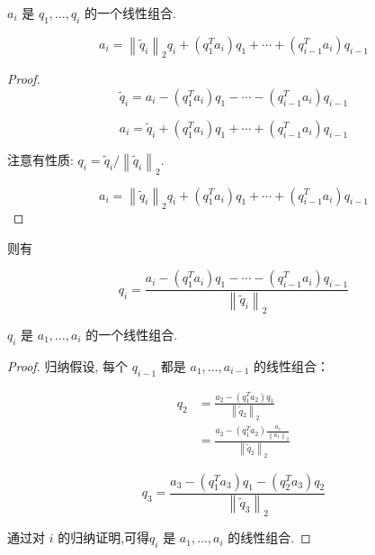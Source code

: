 \begin{corollary}
    $ a_{i} $ 是 $ q_{1}, \ldots, q_{i} $ 的一个线性组合.
    
    $$ a_{i}=\left\|\tilde{q}_{i}\right\|_{2} q_{i}+\left(q_{1}^{T} a_{i}\right) q_{1}+\cdots+\left(q_{i-1}^{T} a_{i}\right) q_{i-1} $$
\end{corollary}

\begin{proof}
    $$ \widetilde{q}_{i}=a_{i}-\left(q_{1}^{T} a_{i}\right) q_{1}-\cdots-\left(q_{i-1}^{T} a_{i}\right) q_{i-1} $$

    $$a_{i}= \widetilde{q}_{i}+\left(q_{1}^{T} a_{i}\right) q_{1}+\cdots+\left(q_{i-1}^{T} a_{i}\right) q_{i-1} $$

    注意有性质: $ q_{i}=\widetilde{q}_{i} /\left\|\widetilde{q}_{i}\right\|_{2} $.

    $$ a_{i}=\left\|\tilde{q}_{i}\right\|_{2} q_{i}+\left(q_{1}^{T} a_{i}\right) q_{1}+\cdots+\left(q_{i-1}^{T} a_{i}\right) q_{i-1} $$
\end{proof}


则有 

\begin{corollary}
    $$q_{i} = \frac{a_{i}-\left(q_{1}^{T} a_{i}\right) q_{1}-\cdots-\left(q_{i-1}^{T} a_{i}\right) q_{i-1}}{\left\|\tilde{q}_{i}\right\|_{2}}$$
\end{corollary}


\begin{corollary}
    $ q_{i} $ 是 $ a_{1}, \ldots, a_{i} $ 的一个线性组合.
\end{corollary}

\begin{proof}
    归纳假设, 每个 $ q_{i-1} $ 都是 $ a_{1}, \ldots, a_{i-1} $ 的线性组合：

    $$ \begin{aligned}q_{2}&= \frac{a_{2}-\left(q_{1}^{T} a_{2}\right) q_{1}}{\left\|\tilde{q}_{2}\right\|_{2}}
        \\ &=
        \frac{a_{2}-\left(q_{1}^{T} a_{2}\right) \frac{ a_{1} }{\left\|a_{1}\right\|_{2}} }{\left\|\tilde{q}_{2}\right\|_{2}}
    \end{aligned} $$

$$ q_{3}=
\frac{a_{3}-\left(q_{1}^{T} a_{3}\right) q_{1}-\left(q_{2}^{T} a_{3}\right) q_{2}}{\left\|\tilde{q}_{3}\right\|_2 }  $$

通过对 $ i $ 的归纳证明,可得$ q_{i} $ 是 $ a_{1}, \ldots, a_{i} $ 的线性组合.
\end{proof}


